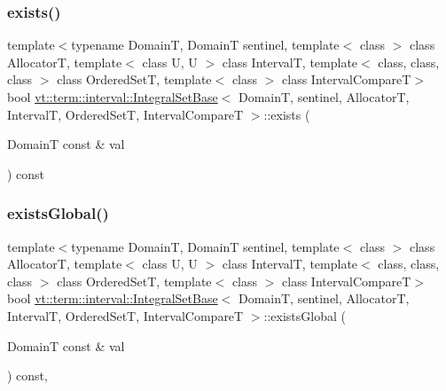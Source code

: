 \subsubsection{\texorpdfstring{exists()}{exists()}}
{\footnotesize\ttfamily template$<$typename DomainT, DomainT sentinel, template$<$ class $>$ class AllocatorT, template$<$ class U, U $>$ class IntervalT, template$<$ class, class, class $>$ class Ordered\+SetT, template$<$ class $>$ class Interval\+CompareT$>$ \\
bool \hyperlink{structvt_1_1term_1_1interval_1_1_integral_set_base}{vt\+::term\+::interval\+::\+Integral\+Set\+Base}$<$ DomainT, sentinel, AllocatorT, IntervalT, Ordered\+SetT, Interval\+CompareT $>$\+::exists (\begin{DoxyParamCaption}\item[{DomainT const \&}]{val }\end{DoxyParamCaption}) const\hspace{0.3cm}{\ttfamily [inline]}}

\mbox{\label{structvt_1_1term_1_1interval_1_1_integral_set_base_abe3fb337e5e5690d72aa6576519e5b86}} 
\subsubsection{\texorpdfstring{exists\+Global()}{existsGlobal()}}
{\footnotesize\ttfamily template$<$typename DomainT, DomainT sentinel, template$<$ class $>$ class AllocatorT, template$<$ class U, U $>$ class IntervalT, template$<$ class, class, class $>$ class Ordered\+SetT, template$<$ class $>$ class Interval\+CompareT$>$ \\
bool \hyperlink{structvt_1_1term_1_1interval_1_1_integral_set_base}{vt\+::term\+::interval\+::\+Integral\+Set\+Base}$<$ DomainT, sentinel, AllocatorT, IntervalT, Ordered\+SetT, Interval\+CompareT $>$\+::exists\+Global (\begin{DoxyParamCaption}\item[{DomainT const \&}]{val }\end{DoxyParamCaption}) const\hspace{0.3cm}{\ttfamily [inline]}, {\ttfamily [private]}}

